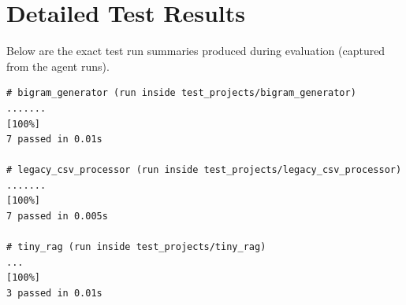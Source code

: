 \documentclass[12pt, a4paper]{article}
\begin{document}
\section{Detailed Test Results}
Below are the exact test run summaries produced during evaluation (captured from the agent runs).

\begin{lstlisting}
# bigram_generator (run inside test_projects/bigram_generator)
.......                                                                                      [100%]
7 passed in 0.01s

# legacy_csv_processor (run inside test_projects/legacy_csv_processor)
.......                                                                [100%]
7 passed in 0.005s

# tiny_rag (run inside test_projects/tiny_rag)
...                                                                                          [100%]
3 passed in 0.01s
\end{lstlisting}
\end{document}
